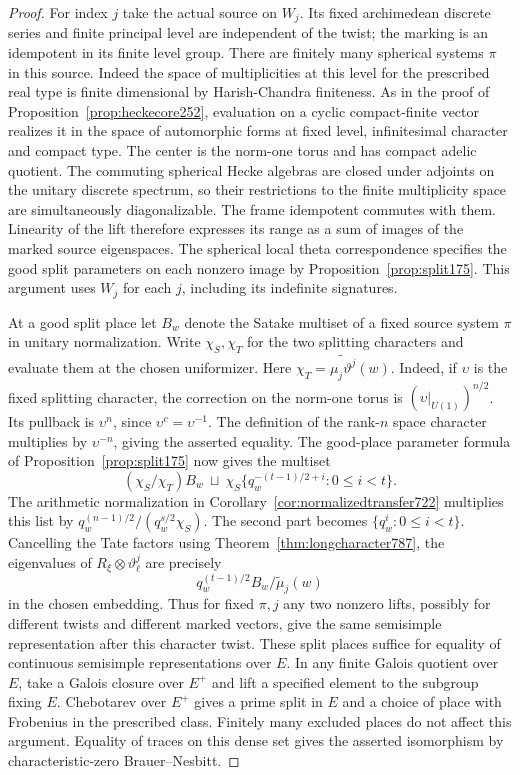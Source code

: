 \documentclass[a4paper,11pt]{article}
\theoremstyle{definition}
\theoremstyle{remark}
\numberwithin{equation}{section}
\begin{document}
\begin{proof}
For index \(j\) take the actual source on \(W_j\). Its fixed
archimedean discrete series and finite principal level are
independent of the twist; the marking is an idempotent in its
finite level group. There are finitely many spherical systems
\(\pi\) in this source. Indeed the space of multiplicities at
this level for the prescribed real type is finite dimensional by
Harish-Chandra finiteness. As in the proof of
Proposition~\ref{prop:heckecore252}, evaluation on a cyclic
compact-finite vector realizes it in the space of automorphic
forms at fixed level, infinitesimal character and compact type.
The center is the norm-one torus and has compact adelic quotient.
The commuting spherical Hecke algebras are closed under
adjoints on the unitary discrete spectrum, so their restrictions
to the finite multiplicity space are simultaneously diagonalizable.
The frame idempotent commutes with them. Linearity of the lift
therefore expresses its range as a sum of images of the marked
source eigenspaces. The spherical local theta correspondence
specifies the good split parameters on each nonzero image by
Proposition~\ref{prop:split175}. This argument uses \(W_j\) for
each \(j\), including its indefinite signatures.

At a good split place let \(B_w\) denote the Satake
multiset of a fixed source system \(\pi\) in unitary normalization.
Write \(\chi_S,\chi_T\) for the two splitting characters
and evaluate them at the chosen uniformizer. Here
\(\chi_T=\widetilde{\mu_j\vartheta^j}(w)\). Indeed, if
\(\upsilon\) is the fixed splitting character, the correction
on the norm-one torus is \((\upsilon|_{U(1)})^{n/2}\). Its
pullback is \(\upsilon^n\), since \(\upsilon^c=\upsilon^{-1}\).
The definition of the rank-\(n\) space character multiplies by
\(\upsilon^{-n}\), giving the asserted equality.
The good-place parameter formula of Proposition~\ref{prop:split175}
now gives the multiset
\[
       (\chi_S/\chi_T)B_w\ \sqcup\
       \chi_S\{q_w^{-(t-1)/2+i}:0\le i<t\}.
\]
The arithmetic normalization in
Corollary~\ref{cor:normalizedtransfer722} multiplies this list by
\(q_w^{(n-1)/2}/(q_w^{s/2}\chi_S)\). The second part becomes
\(\{q_w^i:0\le i<t\}\). Cancelling the Tate factors using
Theorem~\ref{thm:longcharacter787}, the eigenvalues of
\(R_\xi\otimes\vartheta_\ell^j\) are precisely
\[
                 q_w^{(t-1)/2}B_w/\widetilde\mu_j(w)
\]
in the chosen embedding. Thus for fixed \(\pi,j\) any two
nonzero lifts, possibly for different twists and different
marked vectors, give the same semisimple representation after
this character twist.
These split places suffice for equality of continuous semisimple
representations over \(E\). In any finite Galois quotient over
\(E\), take a Galois closure over \(E^+\) and lift a specified
element to the subgroup fixing \(E\). Chebotarev over \(E^+\)
gives a prime split in \(E\) and a choice of place with Frobenius
in the prescribed class. Finitely many excluded places do not
affect this argument. Equality of traces on this dense set gives
the asserted isomorphism by characteristic-zero Brauer--Nesbitt.


\end{proof}
\end{document}
